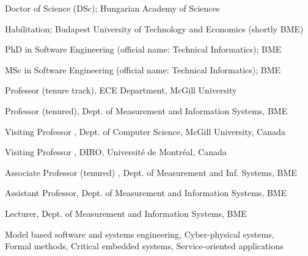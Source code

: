 \documentclass{xetexCV}
\begin{document}
\makecvtitle

Doctor of Science (DSc); Hungarian Academy of Sciences  


Habilitation; Budapest University of Technology and Economics (shortly BME) 

PhD in Software Engineering (official name: Technical Informatics);
BME %

MSc in Software Engineering (official name: Technical Informatics); 
BME %

Professor (tenure track), ECE Department, McGill University

Professor (tenured), Dept. of Measurement and
Information Systems, BME 

Visiting Professor , Dept. of Computer Science, McGill University, Canada

Visiting Professor , DIRO, Universit\'e de Montr\'eal, Canada

Associate Professor (tenured) , Dept. of Measurement and
Inf. Systems, BME 	

Assistant Professor, Dept. of Measurement and
Information Systems, BME 

Lecturer, Dept. of Measurement and Information
Systems, BME

Model based software and systems engineering, Cyber-physical systems, \\
Formal methods, Critical embedded systems, Service-oriented applications 
\end{document}
